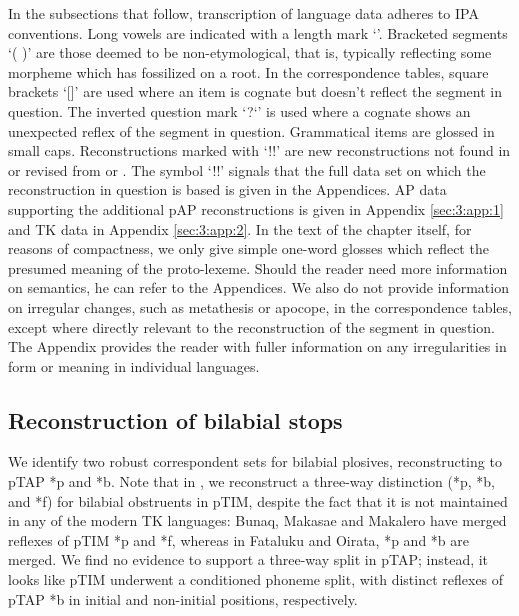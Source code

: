 In the subsections that follow, transcription of language data adheres to IPA conventions. Long vowels are indicated with a length mark `{\textlengthmark}'. Bracketed segments `( )' are those deemed to be non-etymological, that is, typically reflecting some morpheme which has fossilized on a root. In the correspondence tables, square brackets `[]' are used where an item is cognate but doesn't reflect the segment in question. The inverted question mark `?`' is used where a cognate shows an unexpected reflex of the segment in question. Grammatical items are glossed in small caps. Reconstructions marked with `!!' are new reconstructions not found in or revised from \citet{HoltonEtAl2012} or \citet{SchapperEtAl2012}. The symbol `!!' signals that the full data set on which the reconstruction in question is based is given in the Appendices. AP data supporting the additional pAP reconstructions is given in Appendix \ref{sec:3:app:1} and TK data in Appendix \ref{sec:3:app:2}. In the text of the chapter itself, for reasons of compactness, we only give simple one-word glosses which reflect the presumed meaning of the proto-lexeme. Should the reader need more information on semantics, he can refer to the Appendices. We also do not provide information on irregular changes, such as metathesis or apocope, in the correspondence tables, except where directly relevant to the reconstruction of the segment in question. The Appendix provides the reader with fuller information on any irregularities in form or meaning in individual languages. 

\subsection{Reconstruction of bilabial stops}
We identify two robust correspondent sets for bilabial plosives, reconstructing to pTAP *p and *b. Note that in \citet{SchapperEtAl2012}, we reconstruct a three-way distinction (*p, *b, and *f) for bilabial obstruents in pTIM, despite the fact that it is not maintained in any of the modern TK languages: Bunaq, Makasae and Makalero have merged reflexes of pTIM *p and *f, whereas in Fataluku and Oirata, *p and *b are merged. We find no evidence to support a three-way split in pTAP; instead, it looks like pTIM underwent a conditioned phoneme split, with distinct reflexes of pTAP *b in initial and non-initial positions, respectively. 

